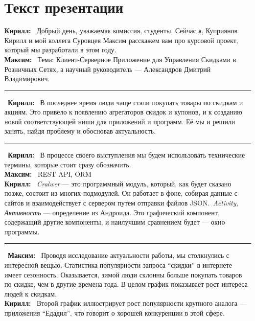 \documentclass[12pt]{article}
\newcommand{\kir}{\textbf{Кирилл: }}
\renewcommand{\max}{\textbf{Максим: }}
\renewcommand{\line}{\noindent\rule{\textwidth}{1pt}}
\begin{document}
\section*{Текст презентации}

\kir\ Добрый день, уважаемая комиссия, студенты. Сейчас я, Куприянов Кирилл и мой
коллега Суровцев Максим расскажем вам про курсовой проект, который мы
разработали в этом году.\\
\max\ Тема: Клиент-Серверное Приложение для Управления Скидками в Розничных
Сетях, а научный руководитель --- Александров Дмитрий Владимирович.\\
\line\
\kir\ В последнее время люди чаще стали покупать товары по скидкам и акциям. Это
привело к появлению агрегаторов скидок и купонов, и к созданию новой
соответствующей ниши для приложений и программ. Её мы и решили занять, найдя
проблему и обосновав актуальность.\\
\line\
\kir\ В процессе своего выступления мы будем использовать технические термины,
которые стоит сразу обозначить.\\
\max\ REST API, ORM\\
\kir\ \textit{Cralwer} --- это программный модуль,
который, как будет сказано позже, состоит из многих подмодулей. Он работает в
фоне, собирая данные с сайтов и взаимодействует с сервером путем отправки
файлов JSON.\ \textit{Activity, Активность} ---
определение из Андроида. Это графический компонент, содержащий другие
компоненты, и наилучшим сравнением будет --- окно программы.\\
\line\
\max\ Проводя исследование актуальности работы, мы столкнулись с интересной вещью.
Статистика популярности запроса ``скидки'' в интернете имеет сезонность.
Оказывается, зимой люди склонны больше покупать товаров по скидке, чем в другие
времена года. В целом график показывает рост интереса людей к скидкам.\\
\kir\ Второй график иллюстрирует рост популярности крупного аналога ---
приложения ``Едадил'', что говорит о хорошей конкуренции в этой сфере.


\end{document}
